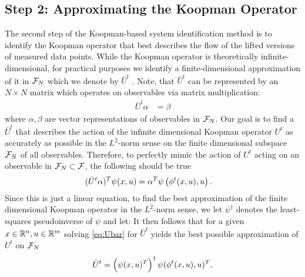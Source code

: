 \subsection{Step 2: Approximating the Koopman Operator} \label{sec:step2}

The second step of the Koopman-based system identification method is to identify the Koopman operator that best describes the flow of the lifted versions of measured data points.
While the Koopman operator is theoretically infinite-dimensional, for practical purposes we identify a finite-dimensional approximation of it in $\mathcal{F}_N$ which we denote by $\bar{U}^t$ .
Note, that $\bar{U}^t$ can be represented by an $N \times N$ matrix which operates on observables via matrix multiplication:
\begin{align}
    \bar{U}^t {\alpha} &= {\beta} 
    \label{eq:Ubar}
\end{align}
where $\alpha, \beta$ are vector representations of observables in $\mathcal{F}_N$.
Our goal is to find a $\bar{U}^t$ that describes the action of the infinite dimensional Koopman operator $U^t$ as accurately as possible in the $L^2$-norm sense on the finite dimensional subspace $\mathcal{F}_N$  of all observables.
Therefore, to perfectly mimic the action of $U^t$ acting on an observable in $\mathcal{F}_N \subset \mathcal{F}$, the following should be true
\begin{align}
    ( \bar{U}^t {\alpha} )^T {\psi}(x, u) &=
    {\alpha}^T {\psi} \left( \phi^t(x,u), u \right).
    \label{eq:Ubar}
\end{align}
Since this is just a linear equation, to find the best approximation of the finite dimensional Koopman operator in the $L^2$-norm sense, we let  ${\psi}^\dagger$ denotes the least-squares pseudoinverse of ${\psi}$ and let: 
It then follows that for a given ${x \in \mathbb{R}^n, u \in \mathbb{R}^m}$ solving \eqref{eq:Ubar} for $\bar{U}^t$ yields the best possible approximation of $U^t$ on $\mathcal{F}_N$
\begin{align}
    \bar{U}^t = \left( {\psi}(x, u)^T \right)^\dagger {\psi}( \phi^t(x,u), u )^T.
    \label{eq:Uapprox}
\end{align}

